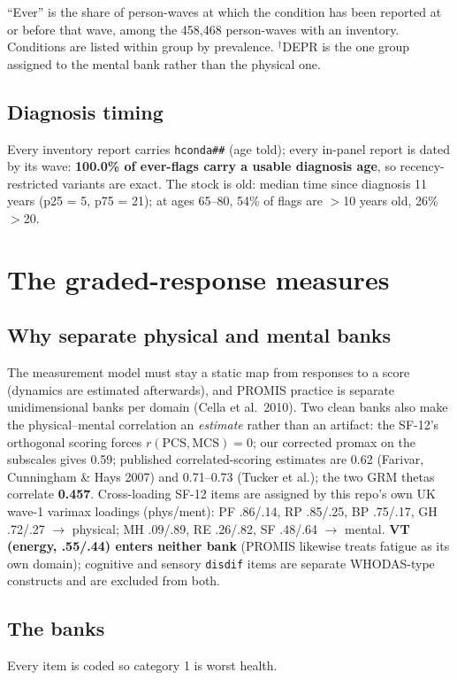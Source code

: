 \documentclass[11pt]{article}
\newcommand{\code}[1]{\texttt{\small #1}}
\begin{document}
\begin{center}
{\scriptsize ``Ever'' is the share of person-waves at which the condition has
been reported at or before that wave, among the 458{,}468 person-waves with
an inventory. Conditions are listed within group by prevalence.
$^{\dagger}$DEPR is the one group assigned to the mental bank rather than the
physical one.}
\end{center}

\subsection{Diagnosis timing}
Every inventory report carries \code{hconda\#\#} (age told); every in-panel
report is dated by its wave: \textbf{100.0\% of ever-flags carry a usable
diagnosis age}, so recency-restricted variants are exact. The stock is old:
median time since diagnosis 11 years (p25 = 5, p75 = 21); at ages 65--80, 54\% of
flags are $>$10 years old, 26\% $>$20.

\section{The graded-response measures}

\subsection{Why separate physical and mental banks}
The measurement model must stay a static map from responses to a score
(dynamics are estimated afterwards), and PROMIS practice is separate
unidimensional banks per domain (Cella et al.\ 2010). Two clean banks also
make the physical--mental correlation an \emph{estimate} rather than an
artifact: the SF-12's orthogonal scoring forces $r(\mathrm{PCS},
\mathrm{MCS})=0$; our corrected promax on the subscales gives 0.59; published
correlated-scoring estimates are 0.62 (Farivar, Cunningham \& Hays 2007) and
0.71--0.73 (Tucker et al.); the two GRM thetas correlate \textbf{0.457}.
Cross-loading SF-12 items are assigned by this repo's own UK wave-1 varimax
loadings (phys/ment): PF .86/.14, RP .85/.25, BP .75/.17, GH .72/.27
$\rightarrow$ physical; MH .09/.89, RE .26/.82, SF .48/.64 $\rightarrow$
mental. \textbf{VT (energy, .55/.44) enters neither bank} (PROMIS likewise
treats fatigue as its own domain); cognitive and sensory \code{disdif} items
are separate WHODAS-type constructs and are excluded from both.

\subsection{The banks}
Every item is coded so category 1 is worst health.
\end{document}
